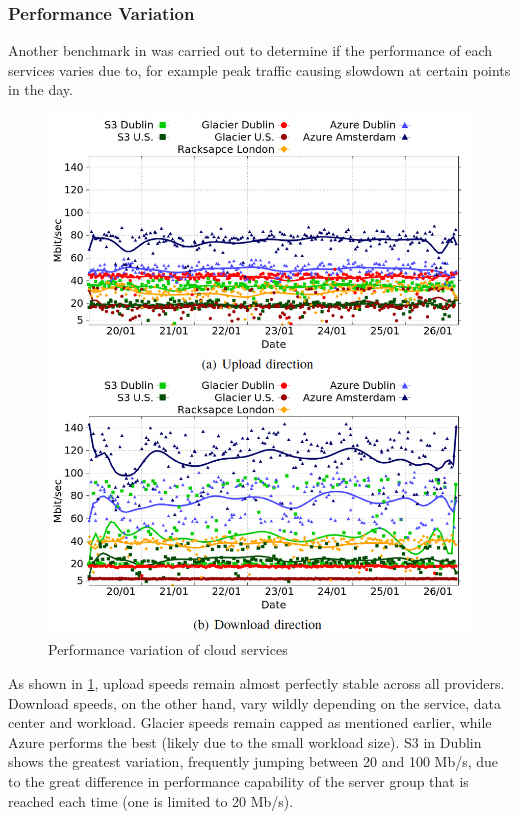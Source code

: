 \subsubsection{Performance Variation}
Another benchmark in \cite{s3vsblob_performance} was carried out to determine if the performance of each services varies due to, for example peak traffic causing slowdown at certain points in the day.
\begin{figure} [h]
    \centering
    \includegraphics[scale=0.5]{images/variation}
    \caption{\label{fig:variation}Performance variation of cloud services}
\end{figure}

As shown in \ref{fig:variation}, upload speeds remain almost perfectly stable across all providers. Download speeds, on the other hand, vary wildly depending on the service, data center and workload. Glacier speeds remain capped as mentioned earlier, while Azure performs the best (likely due to the small workload size). S3 in Dublin shows the greatest variation, frequently jumping between 20 and 100 Mb/s, due to the great difference in performance capability of the server group that is reached each time (one is limited to 20 Mb/s).

